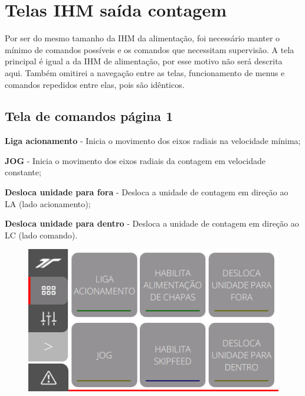 \thispagestyle{fancy}
\vspace*{40 pt}
\section{Telas IHM saída contagem}
 Por ser do mesmo tamanho da IHM da alimentação, foi necessário manter o mínimo de comandos possíveis e os comandos que necessitam supervisão.
 A tela principal é igual a da IHM de alimentação, por esse motivo não será descrita aqui. Também omitirei a navegação entre as telas, funcionamento de menus
 e comandos repedidos entre elas, pois são idênticos.

\subsection{\small{Tela de comandos página 1}}\label{telaComandosSaidaContagem}

\begin{commandsInCount}
  \item[\ding{\dingNumber}] \textbf{Liga acionamento} - Inicia o movimento dos eixos radiais na velocidade mínima;
  \item[\ding{\dingNumber}] \textbf{JOG} - Inicia o movimento dos eixos radiais da contagem em velocidade constante;
  \item[\ding{\dingNumber}] \textbf{Desloca unidade para fora} - Desloca a unidade de contagem em direção ao LA (lado acionamento);
  \item[\ding{\dingNumber}] \textbf{Desloca unidade para dentro} - Desloca a unidade de contagem em direção ao LC (lado comando).
\end{commandsInCount}

\vspace*{\fill}
\begin{figure}[h]
  \centering
  \includegraphics{src/imagesFlexo/12-IHMCNT/e-2.png}
\end{figure}
\vspace*{\fill}


